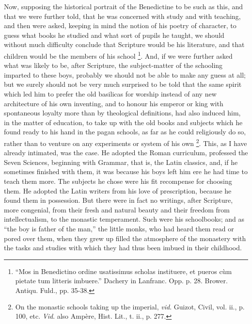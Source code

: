Now, supposing the historical portrait of the Benedictine to be
such as this, and that we were further told, that he was concerned
with study and with teaching, and then were asked, keeping in mind the
notion of his poetry of character, to guess what books he
studied and what sort of pupils he taught, we should without much
difficulty conclude that Scripture would be his literature, and that
children would be the members of his school \footnote{``Mos in
Benedictino ordine usatissimus scholas instituere, et pueros cùm
pietate tum litteris imbuere.'' Dachery in Lanfranc. Opp. p. 28.
Brower. Antiqu. Fuld., pp. 35-38.}. And, if we were further asked what was likely to be, after
Scripture, the subject-matter of the schooling imparted to these boys,
probably we should not be able to make any guess at all; but we surely
should not be very much surprised to be told that the same spirit
which led him to prefer the old basilicas for worship instead of any
new architecture of his own inventing, and to honour his emperor or
king with spontaneous loyalty more than by theological definitions,
had also induced him, in the matter of education, to take up with the
old books and subjects which he found ready to his hand in the pagan
schools, as far as he could religiously do so, rather than to venture
on any experiments or system of his own \footnote{On the
monastic schools taking up the imperial, \emph{vid}. Guizot, Civil,
vol. ii., p. 100, etc. \emph{Vid}. also Ampère, Hist. Lit., t. ii.,
p. 277.}. This, as I have already intimated, was the case. He adopted
the Roman curriculum, professed the Seven Sciences, beginning with
Grammar, that is, the Latin classics, and, if he sometimes finished
with them, it was because his boys left him ere he had time to teach
them more. The subjects he chose were his fit recompense for choosing
them. He adopted the Latin writers from his love of prescription,
because he found them in possession. But there were in fact no
writings, after Scripture, more congenial, from their fresh and
natural beauty and their freedom from intellectualism, to the monastic
temperament. Such were his schoolbooks; and as ``the boy is
father of the man,'' the little monks, who had heard them read or
pored over them, when they grew up filled the atmosphere of the
monastery with the tasks and studies with which they had thus been
imbued in their childhood.

